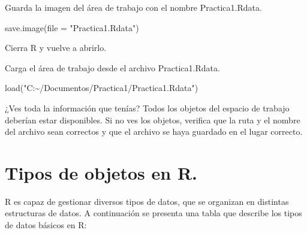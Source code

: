 \documentclass[
  letterpaper,
]{scrbook}
\newenvironment{Shaded}{\begin{snugshade}}{\end{snugshade}}
\newcommand{\AttributeTok}[1]{\textcolor[rgb]{0.40,0.45,0.13}{#1}}
\newcommand{\FunctionTok}[1]{\textcolor[rgb]{0.28,0.35,0.67}{#1}}
\newcommand{\NormalTok}[1]{\textcolor[rgb]{0.00,0.23,0.31}{#1}}
\newcommand{\StringTok}[1]{\textcolor[rgb]{0.13,0.47,0.30}{#1}}
\begin{document}
Guarda la imagen del área de trabajo con el nombre Practica1.Rdata.

\begin{Shaded}
\begin{Highlighting}[]
\FunctionTok{save.image}\NormalTok{(}\AttributeTok{file =} \StringTok{"Practica1.Rdata"}\NormalTok{)}
\end{Highlighting}
\end{Shaded}

Cierra R y vuelve a abrirlo.

Carga el área de trabajo desde el archivo Practica1.Rdata.

\begin{Shaded}
\begin{Highlighting}[]
\FunctionTok{load}\NormalTok{(}\StringTok{"C:\textasciitilde{}/Documentos/Practica1/Practica1.Rdata"}\NormalTok{)}
\end{Highlighting}
\end{Shaded}

¿Ves toda la información que tenías? Todos los objetos del espacio de
trabajo deberían estar disponibles. Si no ves los objetos, verifica que
la ruta y el nombre del archivo sean correctos y que el archivo se haya
guardado en el lugar correcto.

\hypertarget{tipos-de-objetos-en-r.}{%
\chapter{Tipos de objetos en R.}\label{tipos-de-objetos-en-r.}}

R es capaz de gestionar diversos tipos de datos, que se organizan en
distintas estructuras de datos. A continuación se presenta una tabla que
describe los tipos de datos básicos en R:
\end{document}
